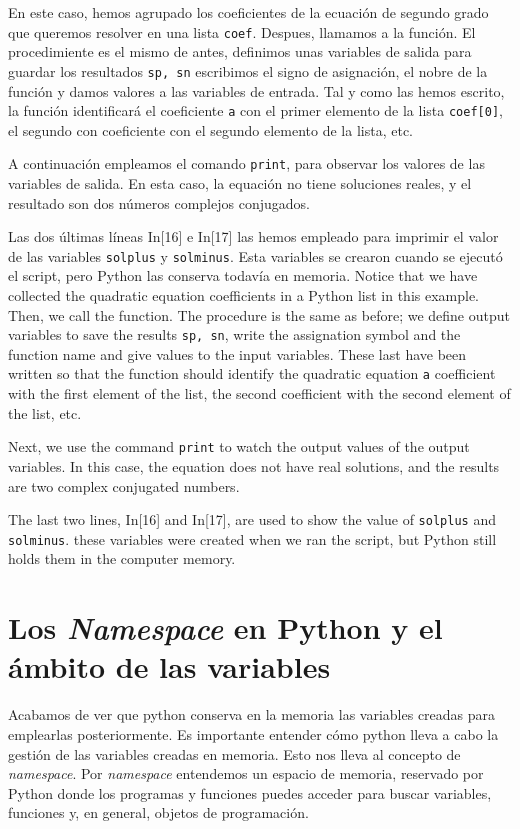 \begin{paracol}{2}
En este caso, hemos agrupado los coeficientes de la ecuación de segundo grado que queremos resolver en una lista \texttt{coef}. Despues, llamamos a la función. El procedimiente es el mismo de antes, definimos unas variables de salida para guardar los resultados \texttt{sp, sn} escribimos el signo de asignación, el nobre de la función y damos valores a las variables de entrada. Tal y como las hemos escrito, la función identificará el coeficiente \texttt{a} con el primer elemento de la lista \texttt{coef[0]}, el segundo con coeficiente con el segundo elemento de la lista, etc.

A continuación empleamos el comando \texttt{print}, para observar los valores de las variables de salida. En esta caso, la equación no tiene soluciones reales, y el resultado son dos números complejos conjugados.

Las dos últimas líneas In[16] e In[17] las hemos empleado para imprimir el valor de las variables \texttt{solplus} y \texttt{solminus}. Esta variables se crearon cuando se ejecutó el script, pero Python las conserva todavía en memoria.
\switchcolumn
Notice that we have collected the quadratic equation coefficients in a Python list in this example. Then, we call the function. The procedure is the same as before; we define output variables to save the results \texttt{sp, sn}, write the assignation symbol and the function name and give values to the input variables. These last have been written so that the function should identify the quadratic equation \texttt{a} coefficient with the first element of the list, the second coefficient with the second element of the list, etc. 

Next, we use the command \texttt{print} to watch the output values of the output variables. In this case, the equation does not have real solutions, and the results are two complex conjugated numbers.

The last two lines, In[16] and In[17], are used to show the value of \texttt{solplus} and \texttt{solminus}. these variables were created when we ran the script, but Python still holds them in the computer memory. 
\switchcolumn
\section{Los \emph{Namespace} en Py\-thon y el ámbito de las variables} 
Acabamos de ver que python conserva en la memoria las variables creadas para emplearlas posteriormente. Es importante entender cómo python lleva a cabo la gestión de las variables creadas en memoria. Esto nos lleva al concepto de \emph{namespace}.
Por \emph{namespace} entendemos un espacio de memoria, reservado por Python donde los programas y funciones puedes acceder para buscar variables, funciones y, en general, objetos de programación.


\end{paracol}
